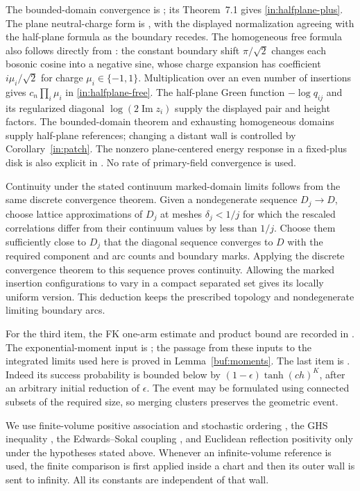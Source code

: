 The bounded-domain convergence is
\cite[Theorem~1.3 and Definitions~3.1--3.2]{CHI2022}; its
Theorem~7.1 gives \eqref{in:halfplane-plus}. The plane neutral-charge
form is \cite[Theorem~4]{Dubedat2011}, with the displayed normalization
agreeing with the half-plane formula as the boundary recedes.
The homogeneous free formula also follows directly from
\cite[Theorem~1.1 and Definition~2.3]{BIVW2025}: the constant boundary
shift $\pi/\sqrt2$ changes each bosonic cosine into a negative sine,
whose charge expansion has coefficient $i\mu_i/\sqrt2$ for charge
$\mu_i\in\{-1,1\}$. Multiplication over an even number of insertions
gives $c_n\prod_i\mu_i$ in \eqref{in:halfplane-free}. The half-plane
Green function $-\log q_{ij}$ and its regularized diagonal
$\log(2\operatorname{Im}z_i)$ supply the displayed pair and height
factors. The bounded-domain
theorem and exhausting homogeneous domains supply half-plane
references; changing a distant wall is controlled by
Corollary~\ref{in:patch}. The nonzero plane-centered energy response in a fixed-plus disk is
also explicit in \cite[Theorem~1.1 and Corollary~1.2]{HS2013}.
No rate of primary-field convergence is used.

Continuity under the stated continuum marked-domain limits follows
from the same discrete convergence theorem. Given a nondegenerate
sequence $D_j\to D$, choose lattice approximations of $D_j$ at meshes
$\delta_j<1/j$ for which the rescaled correlations differ from their
continuum values by less than $1/j$. Choose them sufficiently close
to $D_j$ that the diagonal sequence converges to $D$ with the required
component and arc counts and boundary marks. Applying the discrete
convergence theorem to this sequence proves continuity. Allowing the
marked insertion configurations to vary in a compact separated set
gives its locally uniform version. This deduction keeps the prescribed
topology and nondegenerate limiting boundary arcs.

For the third item, the FK one-arm estimate and product bound are
recorded in \cite[Lemmas~3.1--3.3]{IsingToolkit}. The exponential-moment input is
\cite[Section~3.1, Proposition~3.5, Theorem~3.6,
Corollaries~3.7--3.8]{CGN2015}; the passage from these inputs to the
integrated limits used here is proved in Lemma~\ref{buf:moments}.
The last item is \cite[arXiv version~4, Lemmas~4 and~8 and the proof of
Lemma~9]{CJN2020}. Indeed its success probability is bounded below by
$(1-\epsilon)\tanh(ch)^K$, after an arbitrary initial reduction of
$\epsilon$. The event may be formulated using connected subsets of
the required size, so merging clusters preserves the geometric event.

We use finite-volume positive association and stochastic ordering
\cite{FKG1971,Holley1974}, the GHS inequality \cite{GHS1970}, the
Edwards--Sokal coupling \cite{EdwardsSokal1988}, and Euclidean reflection
positivity \cite{FILS1978} only under the hypotheses stated above. Whenever an infinite-volume reference is used, the finite
comparison is first applied inside a chart and then its outer wall
is sent to infinity. All its constants are independent of that wall.
